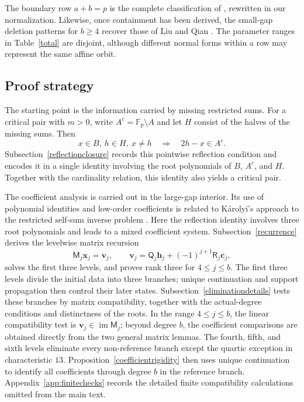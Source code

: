 \documentclass[12pt]{article}
\theoremstyle{remark}
\newcommand{\F}{\mathbb{F}_p}
\begin{document}
The boundary row $a+b=p$ is the complete classification of
\cite[Theorem 1.1]{HLY}, rewritten in our normalization.  Likewise, once
containment has been derived, the small-gap deletion patterns for $b\ge4$
recover those of Liu and Qian \cite[Propositions 3.2(i) and 3.4]{LQ}.
The parameter ranges in Table~\ref{total} are disjoint, although
different normal forms within a row may represent the same affine orbit.

\subsection{Proof strategy}

The starting point is the information carried by missing restricted sums.
For a critical pair with $m>0$, write $A^c=\F\setminus A$ and let $H$
consist of the halves of the missing sums.  Then
\[
 x\in B,\ h\in H,\ x\ne h\quad\Longrightarrow\quad2h-x\in A^c.
\]
Subsection~\ref{reflectionclosure} records this pointwise reflection
condition and encodes it in a single identity involving the
root polynomials of $B$, $A^c$, and $H$.  Together with the cardinality
relation, this identity also yields a critical pair.

The coefficient analysis is carried out in the large-gap interior.
Its use of polynomial identities and low-order coefficients is related
to K\'arolyi's approach to the restricted self-sum inverse problem
\cite[Section 2]{Karolyi}.  Here the reflection identity involves three
root polynomials and leads to a mixed coefficient system.
Subsection~\ref{recurrence} derives the levelwise matrix recursion
\[
 \mathsf M_j\mathbf x_j=\mathbf v_j,
 \qquad
 \mathbf v_j=\mathsf Q_j\mathbf h_j+(-1)^{j+1}\mathsf R_j\mathbf c_j,
\]
solves the first three levels, and proves rank three for
$4\le j\le b$.  The first three levels divide the initial data into
three branches; unique continuation and support propagation then
control their later states.  Subsection~\ref{eliminationdetails} tests
these branches by matrix compatibility, together with the actual-degree
conditions and distinctness of the roots.  In the range $4\le j\le b$,
the linear compatibility test is
$\mathbf v_j\in\operatorname{im}\mathsf M_j$; beyond degree $b$, the
coefficient comparisons are obtained directly from the two general
matrix lemmas.  The fourth, fifth, and sixth levels eliminate every
non-reference branch except the quartic exception in characteristic
$13$.  Proposition~\ref{coefficientrigidity} then uses
unique continuation to identify all coefficients through degree $b$ in
the reference branch.  Appendix~\ref{app:finitechecks} records the
detailed finite compatibility calculations omitted from the main text.
\end{document}
